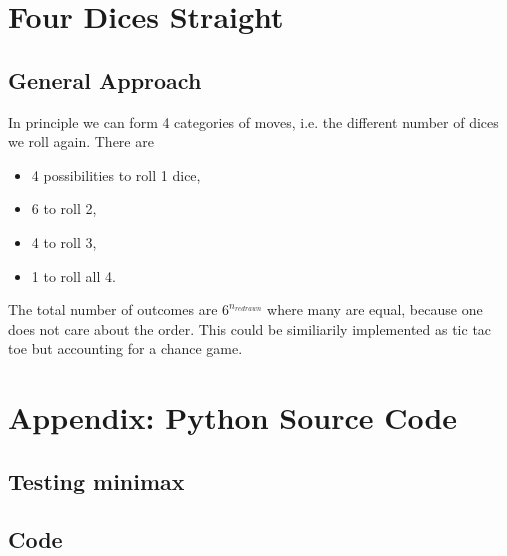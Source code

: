 \documentclass[11pt,a4paper,twoside]{article}
\begin{document}
\section{Four Dices Straight}
\subsection*{General Approach}
In principle we can form 4 categories of moves, i.e. the different number of dices we roll again. There are
\begin{itemize}
	\item 4 possibilities to roll 1 dice,
	\item 6 to roll 2,
	\item 4 to roll 3,
	\item 1 to roll all 4.
\end{itemize}
The total number of outcomes are $6^{n_{redrawn}}$ where many are equal, because one does not care about the order.
This could be similiarily implemented as tic tac toe but accounting for a chance game.


\FloatBarrier

\newpage
\section{Appendix: Python Source Code}
\label{sec:app}

\subsection{Testing minimax}
\label{sub:testing}


\subsection{Code}

\end{document}
